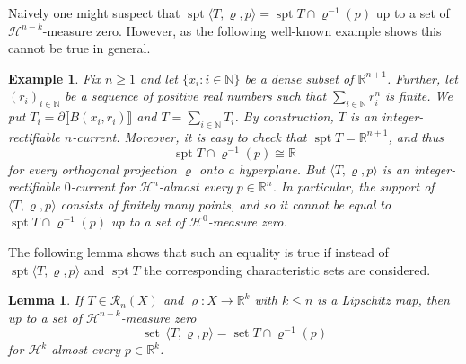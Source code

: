 \documentclass[reqno]{amsart}
\newtheorem{example}[theorem]{Example}
\newtheorem{lemma}[theorem]{Lemma}
\numberwithin{equation}{section}
\newcommand{\R}{\mathbb{R}}
\newcommand{\N}{\mathbb{N}}
\newcommand{\Ha}{\mathcal{H}}
\newcommand{\spt}{\operatorname{spt}}
\newcommand{\bb}[1]{\llbracket #1\rrbracket}
\DeclareMathOperator{\set}{set}
\renewcommand{\rho}{\varrho}
\begin{document}
Naively one might suspect that \( \spt \langle T, \rho, p\rangle = \spt T\cap  \rho^{-1}(p)\) up to a set of \(\Ha^{n-k}\)-measure zero. However, as the following well-known example shows this cannot be true in general.
\begin{example}\label{ex:spt-vs-set}
Fix \(n\geq 1\) and let \(\{ x_i : i\in \N\}\) be a dense subset of \(\R^{n+1}\). Further,  let \((r_i)_{i\in \N}\) be a sequence of positive real numbers such that \(\sum_{i\in \N} r_i^n\) is finite. We put \(T_i=\partial \bb{B(x_i, r_i)}\) and \(T=\sum_{i\in\N} T_i\). By construction, \(T\) is an integer-rectifiable \(n\)-current. Moreover, it is easy to check that \(\spt T=\R^{n+1}\), and thus 
\[
\spt T \cap  \rho^{-1}(p)\cong \R
\]
for every orthogonal projection \(\rho\) onto a hyperplane. But \(\langle T, \rho, p\rangle\) is an integer-rectifiable \(0\)-current for \(\mathcal{H}^n\)-almost every \(p\in \R^n\). In particular, the support of \(\langle T, \rho, p\rangle\) consists of finitely many points, and so it cannot be equal to  \(\spt T\cap  \rho^{-1}(p)\) up to a set of \(\mathcal{H}^0\)-measure zero.
\end{example}

The following lemma shows that such an equality is true if instead of \(\spt \langle T, \rho , p \rangle\) and \(\spt T\) the corresponding characteristic sets are considered. 

\begin{lemma}\label{lem:support-of-sliced-measure-equals-slice}
If \(T\in \mathcal R_n(X)\) and \(\rho \colon X\to \R^k\) with \(k\leq n\) is a Lipschitz map, then up to a set of \(\Ha^{n-k}\)-measure zero
\begin{equation}\label{eq:support-of-slices}
\set\, \langle T, \rho, p \rangle = \set T \cap \rho^{-1}(p)
\end{equation}
for \(\Ha^k\)-almost every \(p\in \R^k\).
\end{lemma}
\end{document}
